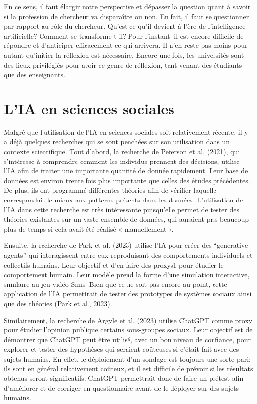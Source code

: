 \documentclass[
  letterpaper,
  DIV=11,
  numbers=noendperiod]{scrreprt}
\begin{document}
En ce sens, il faut élargir notre perspective et dépasser la question
quant à savoir si la profession de chercheur va disparaître ou non. En
fait, il faut se questionner par rapport au rôle du chercheur. Qu'est-ce
qu'il devient à l'ère de l'intelligence artificielle? Comment se
transforme-t-il? Pour l'instant, il est encore difficile de répondre et
d'anticiper efficacement ce qui arrivera. Il n'en reste pas moins pour
autant qu'initier la réflexion est nécessaire. Encore une fois, les
universités sont des lieux privilégiés pour avoir ce genre de réflexion,
tant venant des étudiants que des enseignants.

\section{L'IA en sciences sociales}\label{lia-en-sciences-sociales}

Malgré que l'utilisation de l'IA en sciences sociales soit relativement
récente, il y a déjà quelques recherches qui se sont penchées sur son
utilisation dans un contexte scientifique. Tout d'abord, la recherche de
Peterson et al. (2021), qui s'intéresse à comprendre comment les
individus prennent des décisions, utilise l'IA afin de traiter une
importante quantité de donnée rapidement. Leur base de données est
environ trente fois plus importante que celles des études précédentes.
De plus, ils ont programmé différentes théories afin de vérifier
laquelle correspondait le mieux aux patterns présents dans les données.
L'utilisation de l'IA dans cette recherche est très intéressante
puisqu'elle permet de tester des théories existantes sur un vaste
ensemble de données, qui auraient pris beaucoup plus de temps si cela
avait été réalisé « manuellement ».

Ensuite, la recherche de Park et al. (2023) utilise l'IA pour créer des
``generative agents'' qui interagissent entre eux reproduisant des
comportements individuels et collectifs humains. Leur objectif et d'en
faire des proxys1 pour étudier le comportement humain. Leur modèle prend
la forme d'une simulation interactive, similaire au jeu vidéo Sims. Bien
que ce ne soit pas encore au point, cette application de l'IA
permettrait de tester des prototypes de systèmes sociaux ainsi que des
théories (Park et al., 2023).

Similairement, la recherche de Argyle et al. (2023) utilise ChatGPT
comme proxy pour étudier l'opinion publique certains sous-groupes
sociaux. Leur objectif est de démontrer que ChatGPT peut être utilisé,
avec un bon niveau de confiance, pour explorer et tester des hypothèses
qui seraient coûteuses si c'était fait avec des sujets humains. En
effet, le déploiement d'un sondage est toujours une sorte pari; ils sont
en général relativement coûteux, et il est difficile de prévoir si les
résultats obtenus seront significatifs. ChatGPT permettrait donc de
faire un prétest afin d'améliorer et de corriger un questionnaire avant
de le déployer sur des sujets humains.
\end{document}
